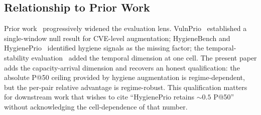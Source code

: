 \subsection{Relationship to Prior Work}

Prior work~\cite{paper1vulnprio,paper3hygienebench,paper4hygieneprio,paper5temporal} progressively widened the evaluation lens. VulnPrio~\cite{paper1vulnprio}
established a single-window null result for CVE-level augmentation;
HygieneBench and HygienePrio~\cite{paper3hygienebench,paper4hygieneprio} identified hygiene signals as the missing factor;
the temporal-stability evaluation~\cite{paper5temporal} added the temporal dimension at one cell. The present paper
adds the capacity-arrival dimension and recovers an honest
qualification: the absolute P@50 ceiling provided by hygiene
augmentation is regime-dependent, but the per-pair relative
advantage is regime-robust. This qualification matters for downstream
work that wishes to cite ``HygienePrio retains $\sim 0.5$ P@50''
without acknowledging the cell-dependence of that number.
